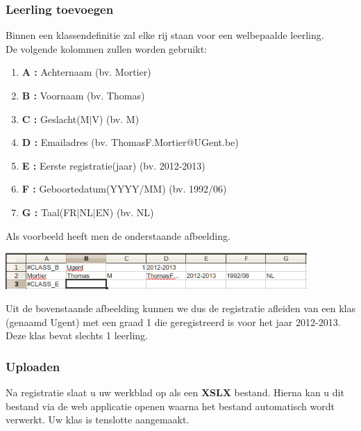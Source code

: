 \begin{section}
\subsubsection{Leerling toevoegen}
Binnen een klassendefinitie zal elke rij staan voor een welbepaalde leerling.\\
De volgende kolommen zullen worden gebruikt:
\begin{enumerate}
\item \textbf{A : } Achternaam (bv. Mortier)
\item \textbf{B : } Voornaam (bv. Thomas)
\item \textbf{C : } Geslacht(M$\vert$V) (bv. M)
\item \textbf{D : } Emailadres (bv. ThomasF.Mortier@UGent.be)
\item \textbf{E : } Eerste registratie(jaar) (bv. 2012-2013)
\item \textbf{F : } Geboortedatum(YYYY/MM) (bv. 1992/06)
\item \textbf{G : } Taal(FR$\vert$NL$\vert$EN) (bv. NL)
\end{enumerate}
Als voorbeeld heeft men de onderstaande afbeelding.
\begin{center}
\includegraphics[height=1.39cm]{img/leerling.png}
\end{center}
Uit de bovenstaande afbeelding kunnen we dus de registratie afleiden van een klas (genaamd Ugent) met een graad 1 die geregistreerd is voor het jaar 2012-2013. Deze klas bevat slechts 1 leerling.
\subsubsection{Uploaden}
Na registratie slaat u uw werkblad op als een \textbf{XSLX} bestand. Hierna kan u dit bestand via de web applicatie openen waarna het bestand automatisch wordt verwerkt. Uw klas is tenslotte aangemaakt.
\end{section}
